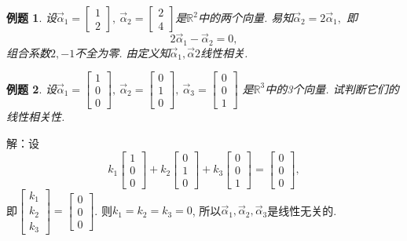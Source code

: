 \documentclass[a4paper]{book}
\newtheorem{eg}{例题}[chapter]
\begin{document}
\begin{eg}
设$\vec{\alpha}_1=\begin{bmatrix}1\\2\end{bmatrix},\ \vec{\alpha}_2=\begin{bmatrix}2\\4\end{bmatrix}$是$\mathbb{R}^2$中的两个向量. 易知$\vec{\alpha}_2=2\vec{\alpha}_1,$ 即$$2\vec{\alpha}_1-\vec{\alpha}_2=0,$$
组合系数$2,-1$不全为零. 由定义知$\vec{\alpha}_1,\vec{\alpha}2$线性相关.
\end{eg}

\begin{eg}
设$\vec{\alpha}_1=\begin{bmatrix}1\\0\\0\end{bmatrix},\ \vec{\alpha}_2=\begin{bmatrix}0\\1\\0\end{bmatrix},\ \vec{\alpha}_3=\begin{bmatrix}0\\0\\1\end{bmatrix}$ 是$\mathbb{R}^3$中的3个向量. 试判断它们的线性相关性.
\end{eg}
解：设$$k_1\begin{bmatrix}1\\0\\0\end{bmatrix}+k_2\begin{bmatrix}0\\1\\0\end{bmatrix}
 +k_3\begin{bmatrix}0\\0\\1\end{bmatrix}=\begin{bmatrix}0\\0\\0\end{bmatrix},$$
 即$\begin{bmatrix}k_1\\k_2\\k_3\end{bmatrix}=\begin{bmatrix}0\\0\\0\end{bmatrix}$. 则$k_1=k_2=k_3=0$, 所以$\vec{\alpha}_1,\vec{\alpha}_2,\vec{\alpha}_3$是线性无关的.
\end{document}
